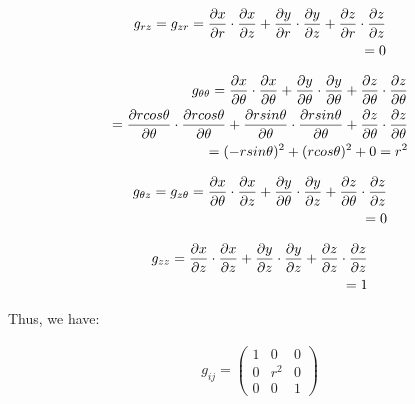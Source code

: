 \documentclass{Note}
\begin{document}
\begin{equation}
\begin{aligned}
g_{r z}=g_{z r}={\partial x\over \partial r}\cdot {\partial x\over \partial z}+{\partial y\over \partial r}\cdot {\partial y\over \partial z}+{\partial z\over \partial r}\cdot {\partial z\over \partial z}\\
=0
\end{aligned}
\end{equation}

\begin{equation}
\begin{aligned}
g_{\theta \theta}={\partial x\over \partial \theta}\cdot {\partial x\over \partial \theta}+{\partial y\over \partial \theta}\cdot {\partial y\over \partial \theta}+{\partial z\over \partial \theta}\cdot {\partial z\over \partial \theta}\\
={\partial rcos\theta\over \partial \theta}\cdot {\partial rcos\theta\over \partial \theta}+{\partial r sin\theta\over \partial \theta}\cdot {\partial r sin\theta\over \partial \theta}+{\partial z\over \partial \theta}\cdot {\partial z\over \partial \theta}\\
=(-r sin\theta)^2+(r cos\theta)^2+0=r^2
\end{aligned}
\end{equation}

\begin{equation}
\begin{aligned}
g_{\theta z}=g_{z \theta}={\partial x\over \partial \theta}\cdot {\partial x\over \partial z}+{\partial y\over \partial \theta}\cdot {\partial y\over \partial z}+{\partial z\over \partial \theta}\cdot {\partial z\over \partial z}\\
=0
\end{aligned}
\end{equation}

\begin{equation}
\begin{aligned}
g_{z z}={\partial x\over \partial z}\cdot {\partial x\over \partial z}+{\partial y\over \partial z}\cdot {\partial y\over \partial z}+{\partial z\over \partial z}\cdot {\partial z\over \partial z}\\
=1
\end{aligned}
\end{equation}

Thus, we have:

\begin{equation}
\begin{aligned}
g_{ij}=
\begin{pmatrix}
1 & 0 & 0\\ 0 &r^2 & 0\\0 & 0 &1
\end{pmatrix}
\end{aligned}
\end{equation}
\end{document}
